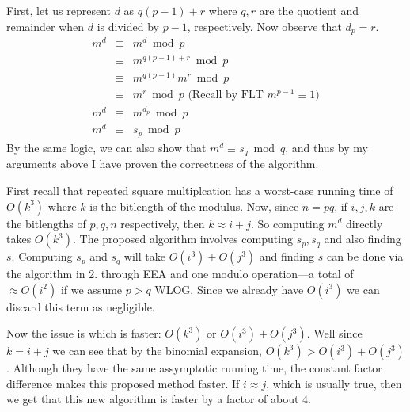 \documentclass[12pt]{article}
\begin{document}
\begin{list}{.}{}
\begin{list}{)}{}
First, let us represent $d$ as $q(p-1)+r$ where $q,r$ are the quotient and
remainder when $d$ is divided by $p-1$, respectively.  Now observe that $d_p =
r$.
\begin{eqnarray*}
m^d &\equiv& m^d \bmod p\\
&\equiv&m^{q(p-1)+r} \bmod p\\
&\equiv&m^{q(p-1)}m^r \bmod p\\
&\equiv&m^r \bmod p \textrm{  (Recall by FLT } m^{p-1} \equiv 1)\\
m^d &\equiv& m^{d_p} \bmod p\\
m^d &\equiv& s_p \bmod p
\end{eqnarray*}
By the same logic, we can also show that $m^d \equiv s_q \bmod q$, and thus by
my arguments above I have proven the correctness of the algorithm.

\item First recall that repeated square multiplcation has a worst-case running
time of $O(k^3)$ where $k$ is the bitlength of the modulus.  Now, since $n =
pq$, if $i,j,k$ are the bitlengths of $p,q,n$ respectively, then $k \approx i +
j$.  So computing $m^d$ directly takes $O(k^3)$.  The proposed algorithm
involves computing $s_p, s_q$ and also finding $s$.  Computing $s_p$ and $s_q$
will take $O(i^3) + O(j^3)$ and finding $s$ can be done via the algorithm in 2.
through EEA and one modulo operation---a total of $\approx O(i^2)$ if we assume
$p > q$ WLOG.  Since we already have $O(i^3)$ we can discard this term as
negligible.

Now the issue is which is faster: $O(k^3)$ or $O(i^3) + O(j^3)$.  Well since
$k=i+j$ we can see that by the binomial expansion, $O(k^3) > O(i^3) + O(j^3)$.
Although they have the same assymptotic running time, the constant factor
difference makes this proposed method faster.  If $i \approx j$, which is
usually true, then we get that this new algorithm is faster by a factor of about
4.


\end{list}
\end{list}
\end{document}
